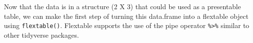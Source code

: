 \documentclass[
]{book}
\newenvironment{Shaded}{\begin{snugshade}}{\end{snugshade}}
\newcommand{\DataTypeTok}[1]{\textcolor[rgb]{0.13,0.29,0.53}{#1}}
\newcommand{\KeywordTok}[1]{\textcolor[rgb]{0.13,0.29,0.53}{\textbf{#1}}}
\newcommand{\NormalTok}[1]{#1}
\newcommand{\OperatorTok}[1]{\textcolor[rgb]{0.81,0.36,0.00}{\textbf{#1}}}
\newcommand{\OtherTok}[1]{\textcolor[rgb]{0.56,0.35,0.01}{#1}}
\newcommand{\StringTok}[1]{\textcolor[rgb]{0.31,0.60,0.02}{#1}}
\begin{document}
\begin{Shaded}
\end{Shaded}

Now that the data is in a structure (2 X 3) that could be used as a presentable table, we can make the first step of turning this data.frame into a flextable object using \texttt{flextable()}. Flextable supports the use of the pipe operator \texttt{\%\textgreater{}\%} similar to other tidyverse packages.

\begin{Shaded}
\end{Shaded}

\providecommand{\docline}[3]{\noalign{\global\setlength{\arrayrulewidth}{#1}}\arrayrulecolor[HTML]{#2}\cline{#3}}

\setlength{\tabcolsep}{8pt}

\renewcommand*{\arraystretch}{1.5}
\end{document}
